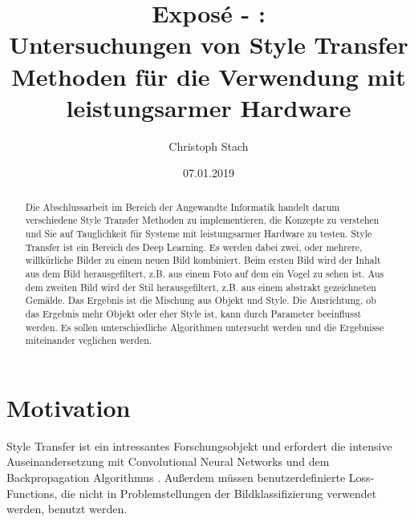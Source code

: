 


\title{\bf Exposé - \@exposeType:\protect\\ Untersuchungen von Style Transfer Methoden für die Verwendung mit leistungsarmer Hardware}
\author{Christoph Stach}
\date{07.01.2019}



\maketitle

\begin{otherlanguage}{ngerman}
	\begin{abstract}
		Die Abschlussarbeit im Bereich der Angewandte Informatik handelt darum verschiedene Style Transfer Methoden zu implementieren,
		die Konzepte zu verstehen und Sie auf Tauglichkeit für Systeme mit leistungsarmer Hardware zu testen. Style Transfer ist ein Bereich des 
		Deep Learning. Es werden dabei zwei, oder mehrere, willkürliche Bilder zu einem neuen Bild kombiniert. Beim ersten Bild wird der Inhalt aus
		dem Bild herausgefiltert, z.B. aus einem Foto auf dem ein Vogel zu sehen ist. Aus dem zweiten Bild wird der Stil herausgefiltert, 
		z.B. aus einem abstrakt gezeichneten Gemälde. Das Ergebnis ist die Mischung aus Objekt und Style. Die Ausrichtung, ob das Ergebnis mehr 
		Objekt oder eher Style ist, kann durch Parameter beeinflusst werden. Es sollen unterschiedliche Algorithmen untersucht werden und
		die Ergebnisse miteinander veglichen werden.
	\end{abstract}
\end{otherlanguage}

\pagebreak

\section{Motivation}
Style Transfer ist ein intressantes Forschungsobjekt und erfordert die intensive Auseinandersetzung mit Convolutional Neural Networks
\cite{lecun-gradientbased-learning-applied-1998} und dem Backpropagation Algorithmus \cite{doi:10.1162/neco.1989.1.4.541}. Außerdem 
müssen benutzerdefinierte Loss-Functions, die nicht in Problemstellungen der Bildklassifizierung verwendet werden, benutzt werden.

